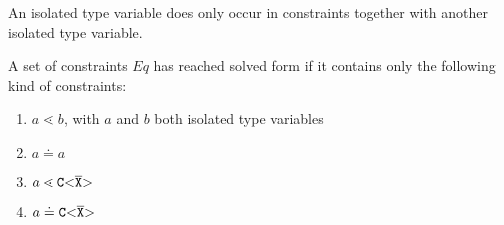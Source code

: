 \begin{definition} \label{def:isolated-type-variable}
  \rm
An isolated type variable does only occur in constraints together with another isolated type variable.
\end{definition}

\begin{definition}\label{def:solved-form}
  \rm
  A set of constraints $Eq$ has reached solved form if it contains only the following kind of constraints:
  \begin{enumerate}
    \item $a \lessdot b$, with $a$ and $b$ both isolated type variables
    \item $a \doteq a$
    \item $a \lessdot \mathtt{C {\tt <} \overline{\tt X} {\tt >} }$
    \item $a \doteq \mathtt{C {\tt <} \overline{\tt X} {\tt >} }$
  \end{enumerate}
\end{definition}

